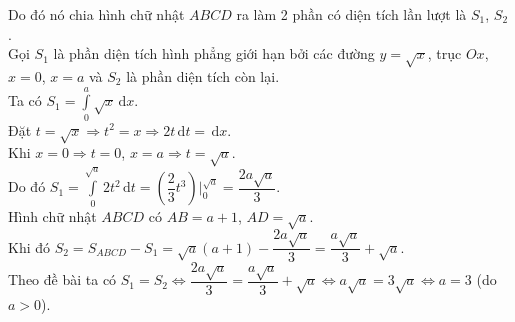 \begin{ex}
{	Do đó nó chia hình chữ nhật $ABCD$ ra làm 2 phần có diện tích lần lượt là $S_1$, $S_2$.\\
	Gọi $S_1$ là phần diện tích hình phẳng giới hạn bởi các đường $y=\sqrt{x}$, trục $Ox$, $x=0$, $x=a$ và $S_2$ là phần diện tích còn lại.\\
	Ta có $S_1=\displaystyle\int\limits_{0}^{a} \sqrt{x} \mathrm{\,d}x$.\\
	Đặt $t=\sqrt{x}\Rightarrow t^2=x\Rightarrow 2t\mathrm{\,d}t =\mathrm{\,d}x$.\\
	Khi $x=0\Rightarrow t=0$, $x=a\Rightarrow t=\sqrt{a}$.\\
	Do đó $S_1=\displaystyle\int\limits_{0}^{\sqrt{a}} 2t^2 \mathrm{\,d}t =\left(\dfrac{2}{3}t^3\right)\bigg |_0^{\sqrt{a}}=\dfrac{2a\sqrt{a}}{3}$.\\
	Hình chữ nhật $ABCD$ có $AB=a+1$, $AD=\sqrt{a}$.\\
	Khi đó $S_2=S_{ABCD}-S_1=\sqrt{a}(a+1)-\dfrac{2a\sqrt{a}}{3}=\dfrac{a\sqrt{a}}{3}+\sqrt{a}$.\\
	Theo đề bài ta có $S_1=S_2\Leftrightarrow \dfrac{2a\sqrt{a}}{3}=\dfrac{a\sqrt{a}}{3}+\sqrt{a}\Leftrightarrow a\sqrt{a}=3\sqrt{a}\Leftrightarrow a=3$ (do $a>0$).
	}
\end{ex}
